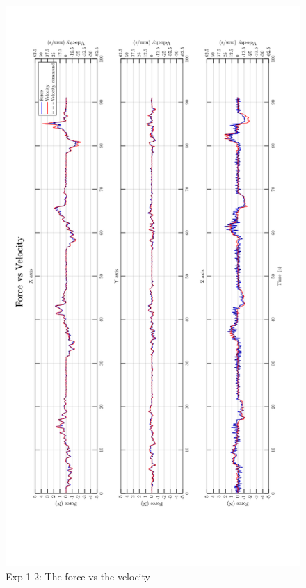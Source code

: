 \begin{figure}[htbp]
\begin{center}
\includegraphics[width=1\linewidth]{Images/exp/exp1_2_2.png}
\caption{Exp 1-2: The force vs the velocity}
\label{fig: exp1_2_2}
\end{center}
\end{figure}	
